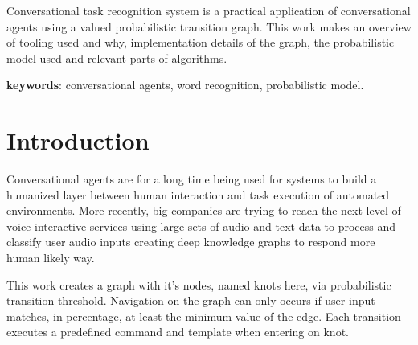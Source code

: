 \documentclass[
	article,			%
	11pt,				%
	oneside,			%
	a4paper,			%
	english,			%
	english,				%
	]{abntex2}
\begin{document}
\frenchspacing 


%
%
\maketitle

\begin{resumoumacoluna}
Conversational task recognition system is a practical application of conversational agents using a valued probabilistic transition graph.
This work makes an overview of tooling used and why, implementation details of the graph, the probabilistic model used and relevant parts
of algorithms.
 
 \vspace{\onelineskip}
 
 \noindent
 \textbf{keywords}: conversational agents, word recognition, probabilistic model.
\end{resumoumacoluna}


\textual

\section*{Introduction}

Conversational agents are for a long time being used for systems to build a 
humanized layer between human interaction and task execution of automated environments.
More recently, big companies are trying to reach the next level of voice interactive
services using large sets of audio and text data to process and classify user audio
inputs creating deep knowledge graphs to respond more human likely way.

This work creates a graph with it's nodes, named knots here, via probabilistic transition
threshold. Navigation on the graph can only occurs if user input matches, in percentage, at
least the minimum value of the edge. Each transition executes a predefined command and
template when entering on knot.
\end{document}
